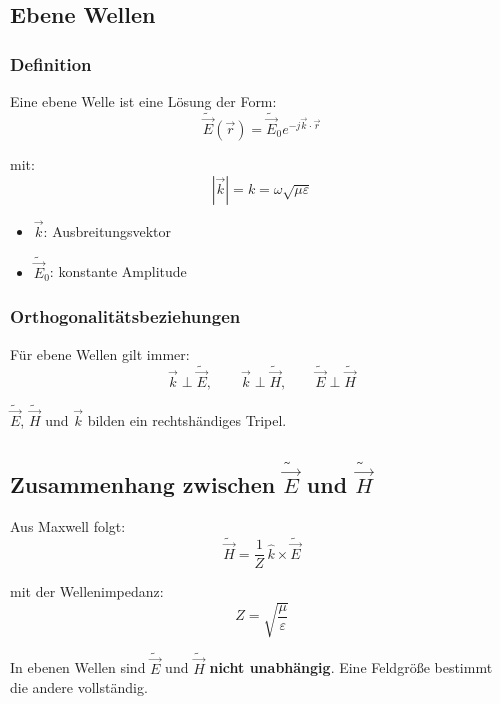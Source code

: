 \documentclass[a4paper]{article}
\newcommand{\imp}[1]{{\color{accent}\bfseries #1}}
\newcommand{\E}{\vec E}
\newcommand{\Hf}{\vec H}
\newcommand{\eps}{\varepsilon}
\begin{document}
\subsection{Ebene Wellen}

\subsubsection{Definition}

Eine ebene Welle ist eine Lösung der Form:
\[
\tilde{\E}(\vec r) = \tilde{\E}_0 e^{-j\vec k\cdot \vec r}
\]

mit:
\[
|\vec k| = k = \omega\sqrt{\mu\eps}
\]

\begin{itemize}
  \item $\vec k$: Ausbreitungsvektor
  \item $\tilde{\E}_0$: konstante Amplitude
\end{itemize}

\subsubsection{Orthogonalitätsbeziehungen}

Für ebene Wellen gilt immer:
\[
\vec k \perp \tilde{\E},
\qquad
\vec k \perp \tilde{\Hf},
\qquad
\tilde{\E} \perp \tilde{\Hf}
\]

\begin{schema}
$\tilde{\E}$, $\tilde{\Hf}$ und $\vec k$ bilden ein rechtshändiges Tripel.
\end{schema}

\subsection{Zusammenhang zwischen $\tilde{\E}$ und $\tilde{\Hf}$}

Aus Maxwell folgt:
\[
\tilde{\Hf} = \frac{1}{Z}\, \hat k \times \tilde{\E}
\]

mit der Wellenimpedanz:
\[
Z = \sqrt{\frac{\mu}{\eps}}
\]

\begin{merke}
In ebenen Wellen sind $\tilde{\E}$ und $\tilde{\Hf}$ \imp{nicht unabhängig}.
Eine Feldgröße bestimmt die andere vollständig.
\end{merke}
\end{document}
